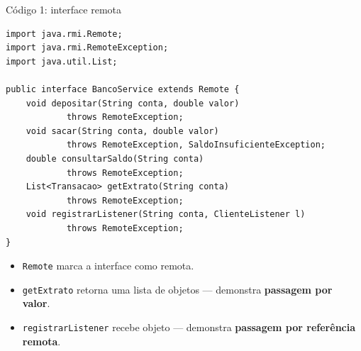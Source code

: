 \documentclass[aspectratio=169]{beamer}
\newcommand{\code}[1]{\texttt{#1}}
\begin{document}
\begin{frame}[fragile]{Código 1: interface remota}
\begin{lstlisting}
import java.rmi.Remote;
import java.rmi.RemoteException;
import java.util.List;

public interface BancoService extends Remote {
    void depositar(String conta, double valor)
            throws RemoteException;
    void sacar(String conta, double valor)
            throws RemoteException, SaldoInsuficienteException;
    double consultarSaldo(String conta)
            throws RemoteException;
    List<Transacao> getExtrato(String conta)
            throws RemoteException;
    void registrarListener(String conta, ClienteListener l)
            throws RemoteException;
}
\end{lstlisting}

\vspace{0.2cm}
\begin{itemize}
    \item \code{Remote} marca a interface como remota.
    \item \code{getExtrato} retorna uma lista de objetos — demonstra \textbf{passagem por valor}.
    \item \code{registrarListener} recebe objeto — demonstra \textbf{passagem por referência remota}.
\end{itemize}
\end{frame}
\end{document}
